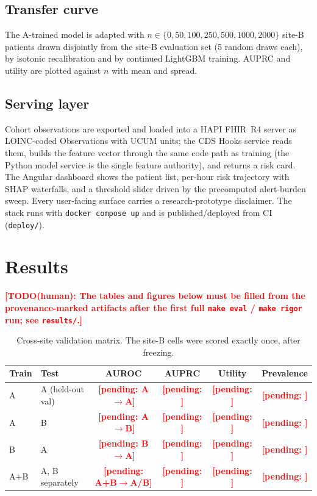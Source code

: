 \documentclass[11pt,a4paper]{article}
\newcommand{\todohuman}[1]{\textcolor{red}{\textbf{[TODO(human): #1]}}}
\newcommand{\pending}[1]{\textcolor{red}{\textbf{[pending: #1]}}}
\begin{document}
\subsection{Transfer curve}
The A-trained model is adapted with $n \in \{0,50,100,250,500,1000,2000\}$
site-B patients drawn disjointly from the site-B evaluation set (5 random
draws each), by isotonic recalibration and by continued LightGBM training.
AUPRC and utility are plotted against $n$ with mean and spread.

\subsection{Serving layer}
Cohort observations are exported and loaded into a HAPI FHIR~R4 server
\citep{fhirr4} as LOINC-coded Observations with UCUM units; the CDS Hooks
service \citep{cdshooks} reads them, builds the feature vector through the same
code path as training (the Python model service is the single feature
authority), and returns a risk card. The Angular dashboard shows the patient
list, per-hour risk trajectory with SHAP waterfalls, and a threshold slider
driven by the precomputed alert-burden sweep. Every user-facing surface carries
a research-prototype disclaimer. The stack runs with \texttt{docker compose up}
and is published/deployed from CI (\texttt{deploy/}).

\section{Results}
\todohuman{The tables and figures below must be filled from the
provenance-marked artifacts after the first full \texttt{make eval} /
\texttt{make rigor} run; see \texttt{results/}.}

\begin{table}[htbp]
\centering
\caption{Cross-site validation matrix. The site-B cells were scored exactly
once, after freezing.}
\label{tab:matrix}
\begin{tabular}{llcccc}
\toprule
Train & Test & AUROC & AUPRC & Utility & Prevalence \\
\midrule
A & A (held-out val) & \pending{A$\to$A} & \pending{} & \pending{} & \pending{} \\
A & B & \pending{A$\to$B} & \pending{} & \pending{} & \pending{} \\
B & A & \pending{B$\to$A} & \pending{} & \pending{} & \pending{} \\
A+B & A, B separately & \pending{A+B$\to$A/B} & \pending{} & \pending{} & \pending{} \\
\bottomrule
\end{tabular}
\end{table}
\end{document}
